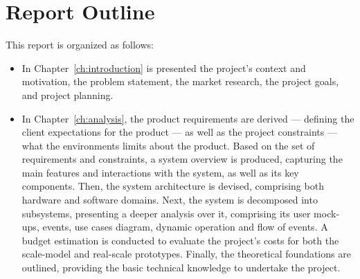\section{Report Outline}%
\label{sec:report-outline}
This report is organized as follows:
\begin{itemize}
\item In Chapter~\ref{ch:introduction} is presented the project's context and
  motivation, the problem statement, the market research, the project goals, and
  project planning.
\item In Chapter~\ref{ch:analysis}, the product requirements are derived --- defining the client expectations
for the product --- as well as the project constraints --- what the environments
limits about the product. Based on the set of requirements and constraints, a
system overview is produced, capturing the main features and interactions with
the system, as well as its key components.
Then, the system architecture is
devised, comprising both hardware and software domains. Next, the system is
decomposed into subsystems, presenting a deeper analysis over it, comprising its
user mock-ups, events, use cases diagram, dynamic operation and flow of
events. A budget estimation is conducted to evaluate the project's costs for
both the scale-model and real-scale prototypes.
Finally, the theoretical foundations are outlined, providing the basic technical knowledge to undertake the project.

\end{itemize}
